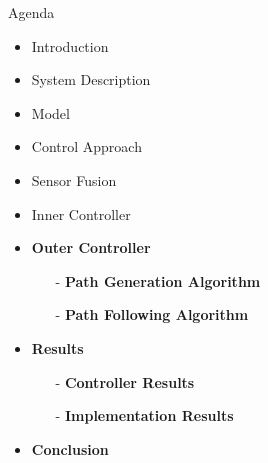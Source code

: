 \begin{frame}{Agenda}{}
    \begin{itemize}
        \item Introduction
        \item System Description
        \item Model
        \item Control Approach
        \item Sensor Fusion
        \item Inner Controller
        \item \textbf{Outer Controller}
        \begin{itemize}
            \item[-] \textbf{Path Generation Algorithm}
            \item[-] \textbf{Path Following Algorithm}
        \end{itemize}
        \item \textbf{Results}
        \begin{itemize}
            \item[-] \textbf{Controller Results}
            \item[-] \textbf{Implementation Results}
        \end{itemize}
        \item \textbf{Conclusion}
    \end{itemize}
\end{frame}